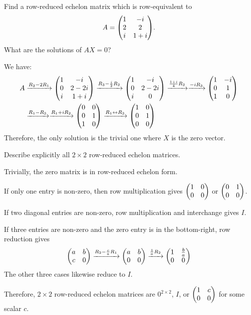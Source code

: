 \begin{xca}
  Find a row-reduced echelon matrix which is row-equivalent to \[ A = \mqty(1&-i \\ 2&2 \\ i&1+i). \]
  What are the solutions of $AX = 0$?
\end{xca}
\begin{sol}
  We have:
  \begin{equation*}
    \begin{split}
      A & \xto{R_2 - 2R_1} \mqty(1&-i \\ 0&2-2i \\ i&1+i)
      \xto{R_3 - \frac{i}{2}R_2} \mqty(1&-i \\ 0&2-2i \\ i&0)
      \xto{\frac{1+i}{4}R_2}
      \xto{-iR_3} \mqty(1&-i \\ 0&1 \\ 1&0) \\
      & \xto{R_1 - R_3}
      \xto{R_1 + iR_2} \mqty(0&0 \\ 0&1 \\ 1&0)
      \xto{R_1 \harr R_3} \mqty(1&0 \\ 0&1 \\ 0&0)
    \end{split}
  \end{equation*}
  Therefore, the only solution is the trivial one where $X$ is the zero vector.
\end{sol}

\begin{xca}
  Describe explicitly all $2 \times 2$ row-reduced echelon matrices.
\end{xca}
\begin{prf}
  Trivially, the zero matrix is in row-reduced echelon form.

  If only one entry is non-zero, then row multiplication gives $\mqty(1&0\\0&0)$ or $\mqty(0&1\\0&0)$.

  If two diagonal entries are non-zero, row multiplication and interchange gives $I$.

  If three entries are non-zero and the zero entry is in the bottom-right, row reduction gives
  \begin{equation*}
    \mqty(a&b \\ c&0) \xto{R_2 - \frac{c}{a}R_1} \mqty(a&b \\ 0&0) \xto{\frac{1}{a}R_2} \mqty(1&\frac{b}{a} \\ 0&0)
  \end{equation*}
  The other three cases likewise reduce to $I$.

  Therefore, $2 \times 2$ row-reduced echelon matrices are $0^{2\times2}$, $I$,
  or $\mqty(1&c \\ 0&0)$ for some scalar $c$.
\end{prf}


